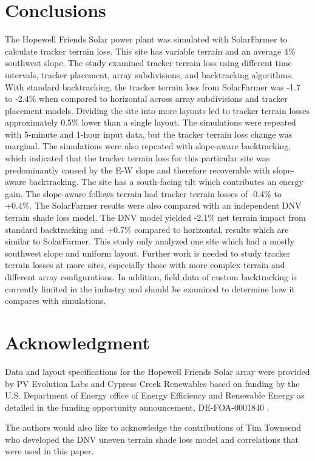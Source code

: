 \documentclass[conference]{IEEEtran}
\begin{document}
\section{Conclusions}
The Hopewell Friends Solar power plant was simulated with SolarFarmer to calculate tracker terrain loss. This site has variable terrain and an average 4\% southwest slope. The study examined tracker terrain loss using different time intervals, tracker placement, array subdivisions, and backtracking algorithms. With standard backtracking, the tracker terrain loss from SolarFarmer was -1.7 to -2.4\% when compared to horizontal across array subdivisions and tracker placement models. Dividing the site into more layouts led to tracker terrain losses approximately 0.5\% lower than a single layout. The simulations were repeated with 5-minute and 1-hour input data, but the tracker terrain loss change was marginal. The simulations were also repeated with slope-aware backtracking, which indicated that the tracker terrain loss for this particular site was predominantly caused by the E-W slope and therefore recoverable with slope-aware backtracking. The site has a south-facing tilt which contributes an energy gain. The slope-aware follows terrain had tracker terrain losses of -0.4\% to +0.4\%. The SolarFarmer results were also compared with an independent DNV terrain shade loss model. The DNV model yielded -2.1\% net terrain impact from standard backtracking and +0.7\% compared to horizontal, results which are similar to SolarFarmer. This study only analyzed one site which had a mostly southwest slope and uniform layout. Further work is needed to study tracker terrain losses at more sites, especially those with more complex terrain and different array configurations. In addition, field data of custom backtracking is currently limited in the industry and should be examined to determine how it compares with simulations.

\section*{Acknowledgment}

Data and layout specifications for the Hopewell Friends Solar array were provided by PV Evolution Labs and Cypress Creek Renewables based on funding by the U.S. Department of Energy office of Energy Efficiency and Renewable Energy as detailed in the funding opportunity announcement, DE-FOA-0001840 \cite{CypressCreekRenewables2019}.

The authors would also like to acknowledge the contributions of Tim Townsend who developed the DNV uneven terrain shade loss model and correlations that were used in this paper.



\end{document}
